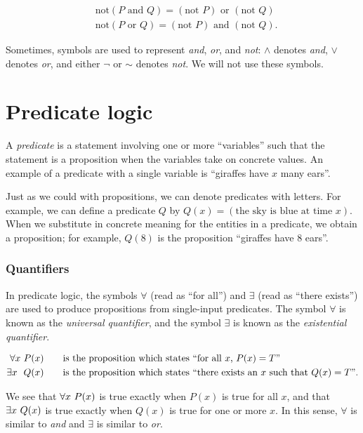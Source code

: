\begin{align*}
    &\text{not}(P \text{ and } Q) = (\text{not } P) \text{ or } (\text{not } Q) \\
    &\text{not}(P \text{ or } Q) = (\text{not } P) \text{ and } (\text{not } Q).
\end{align*}

Sometimes, symbols are used to represent \textit{and}, \textit{or}, and \textit{not}: $\wedge$ denotes \textit{and}, $\vee$ denotes \textit{or}, and either $\neg$ or $\sim$ denotes \textit{not}. We will not use these symbols.

\newpage

\section{Predicate logic}

A \textit{predicate} is a statement involving one or more ``variables'' such that the statement is a proposition when the variables take on concrete values. An example of a predicate with a single variable is ``giraffes have $x$ many ears''.

Just as we could with propositions, we can denote predicates with letters. For example, we can define a predicate $Q$ by $Q(x) = (\text{the sky is blue at time $x$})$. When we substitute in concrete meaning for the entities in a predicate, we obtain a proposition; for example, $Q(8)$ is the proposition ``giraffes have 8 ears''.

\subsubsection*{Quantifiers}

In predicate logic, the symbols $\forall$ (read as ``for all'') and $\exists$ (read as ``there exists'') are used to produce propositions from single-input predicates. The symbol $\forall$ is known as the \textit{universal quantifier}, and the symbol $\exists$ is known as the \textit{existential quantifier}.

\begin{align*}
    \forall x \text{ } P(x) &\qquad \text{is the proposition which states ``for all $x$, $P(x) = T$''} \\
    \exists x \text{ } \text{ } Q(x) &\qquad \text{is the proposition which states ``there exists an $x$ such that $Q(x) = T$''}.
\end{align*}

We see that $\forall x \text{ } P(x)$ is true exactly when $P(x)$ is true for all $x$, and that $\exists x \text{ } Q(x)$ is true exactly when $Q(x)$ is true for one or more $x$. In this sense, $\forall$ is similar to \textit{and} and $\exists$ is similar to \textit{or}.

